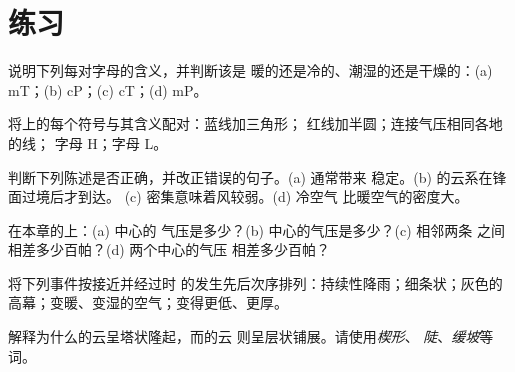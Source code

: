 \section{练习}

\begin{exercise}[$\star$]\label{exo:g8:fronts-and-weather-maps:1}
说明下列每对字母的含义，并判断该是
暖的还是冷的、潮湿的还是干燥的：(a) mT；(b) cP；(c) cT；(d) mP。
\end{exercise}

\begin{exercise}[$\star$]\label{exo:g8:fronts-and-weather-maps:2}
将上的每个符号与其含义配对：蓝线加三角形；
红线加半圆；连接气压相同各地的线；
字母 H；字母 L。
\end{exercise}

\begin{exercise}[$\star$]\label{exo:g8:fronts-and-weather-maps:3}
判断下列陈述是否正确，并改正错误的句子。(a) 通常带来
稳定。(b) 的云系在锋面过境后才到达。
(c) 密集意味着风较弱。(d) 冷空气
比暖空气的密度大。
\end{exercise}

\begin{exercise}[$\star$]\label{exo:g8:fronts-and-weather-maps:4}
在本章的上：(a) 中心的
气压是多少？(b) 中心的气压是多少？(c) 相邻两条
之间相差多少百帕？(d) 两个中心的气压
相差多少百帕？
\end{exercise}

\begin{exercise}[$\star\star$]\label{exo:g8:fronts-and-weather-maps:5}
将下列事件按接近并经过时
的发生先后次序排列：持续性降雨；细条状；灰色的
高幕；变暖、变湿的空气；变得更低、更厚。
\end{exercise}

\begin{exercise}[$\star\star$]\label{exo:g8:fronts-and-weather-maps:6}
解释为什么的云呈塔状隆起，而的云
则呈层状铺展。请使用\emph{楔形}、
\emph{陡}、\emph{缓坡}等词。
\end{exercise}

